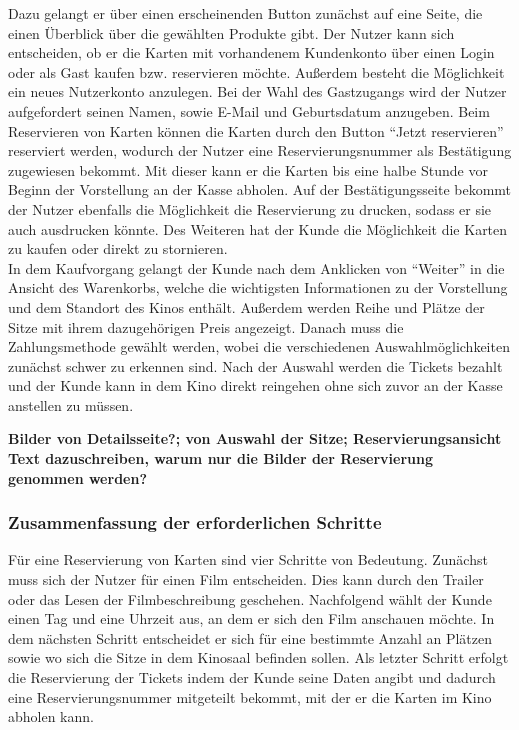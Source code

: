	Dazu gelangt er über einen erscheinenden Button zunächst auf eine Seite, die einen Überblick über die gewählten Produkte gibt. Der Nutzer kann sich entscheiden, ob er die Karten mit vorhandenem Kundenkonto über einen Login oder als Gast kaufen bzw. reservieren möchte. Außerdem besteht die Möglichkeit ein neues Nutzerkonto anzulegen. Bei der Wahl des Gastzugangs wird der Nutzer aufgefordert seinen Namen, sowie E-Mail und Geburtsdatum anzugeben. 
	Beim Reservieren von Karten können die Karten durch den Button \enquote{Jetzt reservieren} reserviert werden, wodurch der Nutzer eine Reservierungsnummer als Bestätigung zugewiesen bekommt. Mit dieser kann er die Karten bis eine halbe Stunde vor Beginn der Vorstellung an der Kasse abholen. Auf der Bestätigungsseite bekommt der Nutzer ebenfalls die Möglichkeit die Reservierung zu drucken, sodass er sie auch ausdrucken könnte. Des Weiteren hat der Kunde die Möglichkeit die Karten zu kaufen oder direkt zu stornieren. 
	\\In dem Kaufvorgang gelangt der Kunde nach dem Anklicken von \enquote{Weiter} in die Ansicht des Warenkorbs, welche die wichtigsten Informationen zu der Vorstellung und dem Standort des Kinos enthält. Außerdem werden Reihe und Plätze der Sitze mit ihrem dazugehörigen Preis angezeigt. Danach muss die Zahlungsmethode gewählt werden, wobei die verschiedenen Auswahlmöglichkeiten zunächst schwer zu erkennen sind. Nach der Auswahl werden die Tickets bezahlt und der Kunde kann in dem Kino direkt reingehen ohne sich zuvor an der Kasse anstellen zu müssen. 
	
	\textbf{Bilder von Detailsseite?; von Auswahl der Sitze; Reservierungsansicht}
	\textbf{Text dazuschreiben, warum nur die Bilder der Reservierung genommen werden?}
	
	\subsubsection{Zusammenfassung der erforderlichen Schritte} 
	Für eine Reservierung von Karten sind vier Schritte von Bedeutung. Zunächst muss sich der Nutzer für einen Film entscheiden. Dies kann durch den Trailer oder das Lesen der Filmbeschreibung geschehen. Nachfolgend wählt der Kunde einen Tag und eine Uhrzeit aus, an dem er sich den Film anschauen möchte. In dem nächsten Schritt entscheidet er sich für eine bestimmte Anzahl an Plätzen sowie wo sich die Sitze in dem Kinosaal befinden sollen. Als letzter Schritt erfolgt die Reservierung der Tickets indem der Kunde seine Daten angibt und dadurch eine Reservierungsnummer mitgeteilt bekommt, mit der er die Karten im Kino abholen kann.
	
